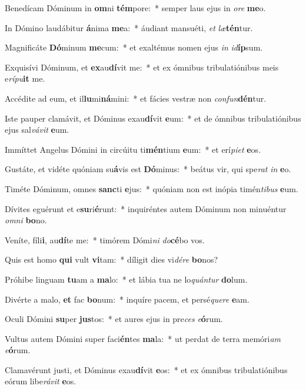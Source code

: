 \item Benedícam Dóminum in \textbf{om}ni \textbf{tém}pore:~* semper laus ejus in \textit{o}\textit{re} \textbf{me}o.
\item In Dómino laudábitur \textbf{á}nima \textbf{me}a:~* áudiant mansuéti, \textit{et} \textit{læ}\textbf{tén}tur.
\item Magnificáte \textbf{Dó}minum \textbf{me}cum:~* et exaltémus nomen ejus \textit{in} \textit{id}\textbf{íp}sum.
\item Exquisívi Dóminum, et \textbf{ex}au\textbf{dí}vit me:~* et ex ómnibus tribulatiónibus meis e\textit{rí}\textit{pu}\textbf{it} me.
\item Accédite ad eum, et il\textbf{lu}mi\textbf{ná}mini:~* et fácies vestræ non \textit{con}\textit{fun}\textbf{dén}tur.
\item Iste pauper clamávit, et Dóminus exau\textbf{dí}vit \textbf{e}um:~* et de ómnibus tribulatiónibus ejus sal\textit{vá}\textit{vit} \textbf{e}um.
\item Immíttet Angelus Dómini in circúitu ti\textbf{mén}tium \textbf{e}um:~* et erí\textit{pi}\textit{et} \textbf{e}os.
\item Gustáte, et vidéte quóniam su\textbf{á}vis est \textbf{Dó}minus:~* beátus vir, qui spe\textit{rat} \textit{in} \textbf{e}o.
\item Timéte Dóminum, omnes \textbf{sanc}ti \textbf{e}jus:~* quóniam non est inópia timén\textit{ti}\textit{bus} \textbf{e}um.
\item Dívites eguérunt et e\textbf{su}ri\textbf{é}runt:~* inquiréntes autem Dóminum non minuéntur \textit{om}\textit{ni} \textbf{bo}no.
\item Veníte, fíli\textbf{i}, au\textbf{dí}te me:~* timórem Dómi\textit{ni} \textit{do}\textbf{cé}bo vos.
\item Quis est homo \textbf{qui} vult \textbf{vi}tam:~* díligit dies vi\textit{dé}\textit{re} \textbf{bo}nos?
\item Próhibe linguam \textbf{tu}am a \textbf{ma}lo:~* et lábia tua ne lo\textit{quán}\textit{tur} \textbf{do}lum.
\item Divérte a malo, \textbf{et} fac \textbf{bo}num:~* inquíre pacem, et persé\textit{que}\textit{re} \textbf{e}am.
\item Oculi Dómini \textbf{su}per \textbf{jus}tos:~* et aures ejus in pre\textit{ces} \textit{e}\textbf{ó}rum.
\item Vultus autem Dómini super faci\textbf{én}tes \textbf{ma}la:~* ut perdat de terra memóri\textit{am} \textit{e}\textbf{ó}rum.
\item Clamavérunt justi, et Dóminus exau\textbf{dí}vit \textbf{e}os:~* et ex ómnibus tribulatiónibus eórum libe\textit{rá}\textit{vit} \textbf{e}os.
